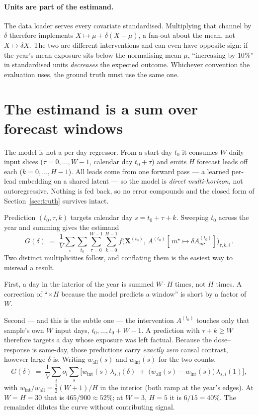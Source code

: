 \documentclass[11pt]{article}
\begin{document}
\paragraph{Units are part of the estimand.} The data loader serves every covariate standardised.
Multiplying that channel by $\delta$ therefore implements $X \mapsto \mu + \delta(X - \mu)$, a
fan-out about the mean, not $X \mapsto \delta X$. The two are different interventions and can even
have opposite sign: if the year's mean exposure sits below the normalising mean $\mu$, ``increasing
by $10\%$'' in standardised units \emph{decreases} the expected outcome. Whichever convention the
evaluation uses, the ground truth must use the same one.

\section{The estimand is a sum over forecast windows}\label{sec:window}

The model is not a per-day regressor. From a start day $t_0$ it consumes $W$ daily input slices
($\tau = 0,\dots,W-1$, calendar day $t_0 + \tau$) and emits $H$ forecast leads off each
($k = 0,\dots,H-1$). All leads come from one forward pass --- a learned per-lead embedding on a
shared latent --- so the model is \emph{direct multi-horizon}, not autoregressive. Nothing is fed
back, so no error compounds and the closed form of Section~\ref{sec:truth} survives intact.

Prediction $(t_0,\tau,k)$ targets calendar day $s = t_0 + \tau + k$. Sweeping $t_0$ across the year
and summing gives the estimand
\begin{equation}\label{eq:estimand}
  G(\delta) \;=\; \frac{1}{V}\sum_{i}\sum_{t_0}\sum_{\tau=0}^{W-1}\sum_{k=0}^{H-1}
     f\big(\mathbf{X}^{(t_0)},\, A^{(t_0)}[\,m^\star \mapsto \delta A^{(t_0)}_{m^\star}]\big)_{\tau,k,i}\,.
\end{equation}
Two distinct multiplicities follow, and conflating them is the easiest way to misread a result.

First, a day in the interior of the year is summed $W \cdot H$ times, not $H$ times. A correction
of ``$\times H$ because the model predicts a window'' is short by a factor of $W$.

Second --- and this is the subtle one --- the intervention $A^{(t_0)}$ touches only that sample's
own $W$ input days, $t_0,\dots,t_0+W-1$. A prediction with $\tau + k \geq W$ therefore targets a
day whose exposure was left factual. Because the dose--response is same-day, those predictions
carry \emph{exactly zero} causal contrast, however large $\delta$ is. Writing $w_{\mathrm{all}}(s)$
and $w_{\mathrm{int}}(s)$ for the two counts,
\begin{equation}
  G(\delta) \;=\; \frac{1}{V}\sum_i o_i \sum_s
    \Big[ w_{\mathrm{int}}(s)\,\lambda_{s,i}(\delta) \;+\;
          \big(w_{\mathrm{all}}(s) - w_{\mathrm{int}}(s)\big)\,\lambda_{s,i}(1) \Big],
\end{equation}
with $w_{\mathrm{int}}/w_{\mathrm{all}} = \tfrac{1}{2}(W{+}1)/H$ in the interior (both ramp at the
year's edges). At $W = H = 30$ that is $465/900 \approx 52\%$; at $W = 3$, $H = 5$ it is
$6/15 = 40\%$. The remainder dilutes the curve without contributing signal.
\end{document}
